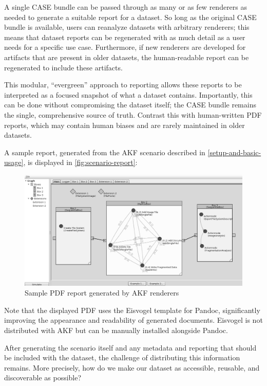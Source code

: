 \documentclass[letterpaper,12pt]{report}
\begin{document}
A single CASE bundle can be passed through as many or as few renderers
as needed to generate a suitable report for a dataset. So long as the
original CASE bundle is available, users can reanalyze datasets with
arbitrary renderers; this means that dataset reports can be regenerated
with as much detail as a user needs for a specific use case.
Furthermore, if new renderers are developed for artifacts that are
present in older datasets, the human-readable report can be regenerated
to include these artifacts.

This modular, ``evergreen'' approach to reporting allows these reports
to be interpreted as a focused snapshot of what a dataset contains.
Importantly, this can be done without compromising the dataset itself;
the CASE bundle remains the single, comprehensive source of truth.
Contrast this with human-written PDF reports, which may contain human
biases and are rarely maintained in older datasets.

A sample report, generated from the AKF scenario described in
\autoref{setup-and-basic-usage}, is
displayed in \autoref{fig:scenario-report}:

\begin{figure}[h]
\centering
\includegraphics[width=1\linewidth]{yannikos.png}
\caption{Sample PDF report generated by AKF
renderers}\label{fig:scenario-report}
\end{figure}

Note that the displayed PDF uses the Eisvogel template
\cite{waglerWandmalfarbePandoclatextemplate2025} for Pandoc,
significantly improving the appearance and readability of generated
documents. Eisvogel is not distributed with AKF but can be manually
installed alongside Pandoc.

After generating the scenario itself and any metadata and reporting that
should be included with the dataset, the challenge of distributing this
information remains. More precisely, how do we make our dataset as
accessible, reusable, and discoverable as possible?
\end{document}
